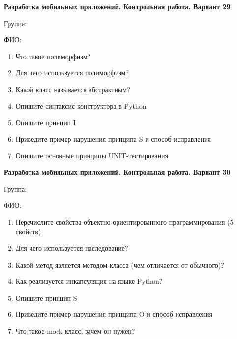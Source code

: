 \documentclass[12pt]{article}
\begin{document}
\vspace{40pt}\begin{minipage}{\textwidth}
\textbf{Разработка мобильных приложений. Контрольная работа. Вариант 29}

Группа: \underline{\hspace{3cm}}

ФИО: \underline{\hspace{10cm}}

\begin{enumerate}
\item Что такое полиморфизм?
\item Для чего используется полиморфизм?
\item Какой класс называется абстрактным?
\item Опишите синтаксис конструктора в Python
\item Опишите принцип I
\item Приведите пример нарушения принципа S и способ исправления
\item Опишите основные принципы UNIT-тестирования

\end{enumerate}
\end{minipage}

\vspace{40pt}\begin{minipage}{\textwidth}
\textbf{Разработка мобильных приложений. Контрольная работа. Вариант 30}

Группа: \underline{\hspace{3cm}}

ФИО: \underline{\hspace{10cm}}

\begin{enumerate}
\item Перечислите свойства объектно-ориентированного программирования (5 свойств)
\item Для чего используется наследование?
\item Какой метод является методом класса (чем отличается от обычного)?
\item Как реализуется инкапсуляция на языке Python?
\item Опишите принцип S
\item Приведите пример нарушения принципа O и способ исправления
\item Что такое mock-класс, зачем он нужен?

\end{enumerate}
\end{minipage}
\end{document}
